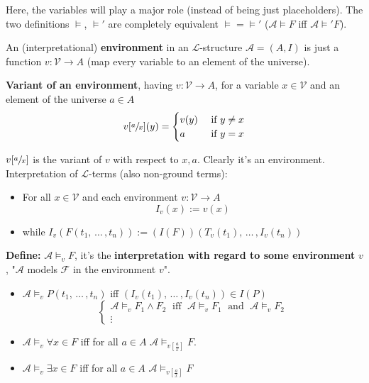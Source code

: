 Here, the variables will play a major role (instead of being just placeholders). The two definitions $\models$, $\models'$ are completely equivalent $\models = \models'$ ($\mathcal{A} \models F$ iff $\mathcal{A} \models' F$).\\

\begin{definition}
	An (interpretational) \textbf{environment} in an $\mathcal{L}$-structure $\mathcal{A} = (A,I)$ is just a function $v: \mathcal{V} \rightarrow A$ (map every variable to an element of the universe).\\
\end{definition}

\begin{definition}
	\textbf{Variant of an environment}, having $v: \mathcal{V} \rightarrow A$, for a variable $x \in \mathcal{V}$ and an element of the universe $a \in A$
	$$ v[\sfrac{a}{x}] (y) = 
	\begin{cases}
		v(y) & \text{ if } y \neq x \\
		a & \text{ if } y = x
	\end{cases}
	$$
\end{definition}
$v[\sfrac{a}{x}]$ is the variant of $v$ with respect to $x,a$. Clearly it's an environment.\\

Interpretation of $\mathcal{L}$-terms (also non-ground terms):
\begin{itemize}
	\item For all $x \in \mathcal{V}$ and each environment $v: \mathcal{V} \rightarrow A$
	$$ I_v (x) := v(x) $$
	\item while $I_v (F(t_1, \, \dots \, , t_n)) := (I(F))(T_v(t_1), \, \dots \, , I_v (t_n))$
\end{itemize} \nn

\textbf{Define:} $\mathcal{A} \models_v F$, it's the \textbf{interpretation with regard to some environment} $v$, "$\mathcal{A}$ models $\mathcal{F}$ in the environment $v$".
\begin{itemize}
	\item $\mathcal{A} \models_v P(t_1, \, \dots \, , t_n)$ iff $(I_v (t_1), \, \dots \, , I_v (t_n)) \in I(P)$
	$$
	\begin{cases}
		\mathcal{A} \models_v F_1 \wedge F_2 \; \text{ iff } \; \mathcal{A} \models_v F_1 \; \text{ and } \; \mathcal{A} \models_v F_2 \\
		\vdots 
	\end{cases}
	$$
	\item $\mathcal{A} \models_v \forall x \in F$ iff for all $a \in A$ $\mathcal{A} \models_{v [\frac{a}{x}]} F$.\\
	\item $\mathcal{A} \models_v \exists x \in F$ iff for all $a \in A$ $\mathcal{A} \models_{v [\frac{a}{x}]} F$
\end{itemize}

